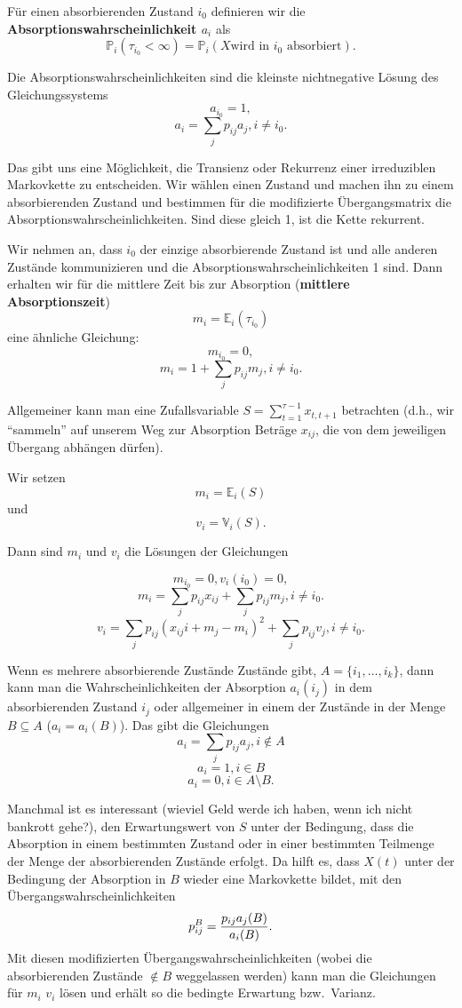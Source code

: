 Für einen absorbierenden Zustand $i_0$ definieren wir die 
\textbf{Absorptionswahrscheinlichkeit $a_i$} als
\[\mathbb P_i(\tau_{i_0}<\infty)=\mathbb P_i(X\mbox{wird in }i_0\mbox{ absorbiert}).\]



\begin{satz}
Die Absorptionswahrscheinlichkeiten sind die kleinste nichtnegative Lösung
des Gleichungssystems
\[a_{i_0}=1,\]
\[a_i=\sum_jp_{ij}a_j, i\neq i_0.\]
\end{satz}

Das gibt uns eine Möglichkeit, die Transienz oder Rekurrenz einer
irreduziblen Markovkette zu entscheiden. Wir wählen einen Zustand und
machen ihn zu einem absorbierenden Zustand und bestimmen für die
modifizierte Übergangsmatrix die Absorptionswahrscheinlichkeiten. Sind diese
gleich 1, ist die Kette rekurrent. 

Wir nehmen an, dass $i_0$ der einzige absorbierende Zustand ist und
alle anderen Zustände kommunizieren und die Absorptionswahrscheinlichkeiten
1 sind.
Dann erhalten wir für die mittlere Zeit bis zur Absorption (\textbf{mittlere Absorptionszeit})
\[m_i=\mathbb E_i(\tau_{i_0})\]
 eine ähnliche Gleichung:
\[m_{i_0}=0,
\]
\[m_i=1+\sum_jp_{ij}m_j, i\neq i_0.\]

Allgemeiner kann man eine Zufallsvariable 
$S=\sum_{t=1}^{\tau-1}x_{t,t+1}$ betrachten (d.h., wir ``sammeln'' auf
unserem Weg zur Absorption Beträge $x_{ij}$, die von dem jeweiligen
Übergang abhängen dürfen). 

Wir setzen 
\[m_i=\mathbb E_i(S)\]
und
\[v_i=\mathbb V_i(S).\]

Dann sind $m_i$ und $v_i$ die Lösungen der Gleichungen

\[m_{i_0}=0,v_i(i_0)=0,\]
\[m_i=\sum_jp_{ij}x_{ij}+\sum_jp_{ij}m_j, i\neq i_0.\]
\[v_i=\sum_jp_{ij}(x_{ij}i+m_j-m_i)^2+\sum_jp_{ij}v_j, i\neq i_0.\]

Wenn es mehrere absorbierende Zustände Zustände gibt, $A=\{i_1,\dots,i_k\}$,
dann kann man die Wahrscheinlichkeiten der Absorption  $a_i(i_j)$ in dem
absorbierenden Zustand $i_j$ oder allgemeiner in einem der Zustände in der
Menge $B\subseteq A$ ($a_i=a_i(B)$). Das gibt die Gleichungen
\[a_i=\sum_jp_{ij}a_j, i\not\in A\]
\[a_i=1, i\in B\]
\[a_i=0, i\in A\setminus B.\]

Manchmal ist es interessant (wieviel Geld werde ich haben, wenn ich nicht
bankrott gehe?), den Erwartungswert von $S$ unter der Bedingung, dass die
Absorption in einem bestimmten Zustand oder in einer bestimmten Teilmenge
der Menge der absorbierenden Zustände erfolgt. 
Da hilft es, dass $X(t)$ unter der Bedingung der Absorption in $B$
wieder eine Markovkette bildet, mit den Übergangswahrscheinlichkeiten
\[p_{ij}^B={p_{ij}a_j(B)\over a_i(B)}.\]
Mit diesen modifizierten Übergangswahrscheinlichkeiten (wobei die
absorbierenden Zustände $\not\in B$ weggelassen werden) kann man
die Gleichungen für $m_i$ $v_i$ lösen und erhält so die bedingte
Erwartung bzw.\ Varianz.




